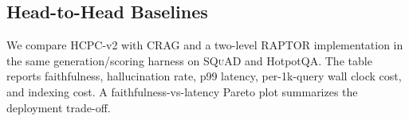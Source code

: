 
\subsection{Head-to-Head Baselines}
\label{sec:fix06_baselines}

We compare HCPC-v2 with CRAG and a two-level RAPTOR implementation in the
same generation/scoring harness on \textsc{SQuAD} and HotpotQA. The table
reports faithfulness, hallucination rate, p99 latency, per-1k-query wall
clock cost, and indexing cost. A faithfulness-vs-latency Pareto plot
summarizes the deployment trade-off.

